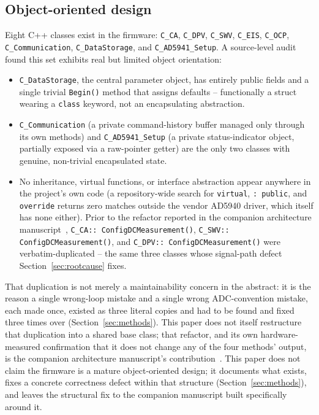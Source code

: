 \subsection{Object-oriented design}
\label{sec:oop}
Eight C++ classes exist in the firmware: \texttt{C\_CA}, \texttt{C\_DPV},
\texttt{C\_SWV}, \texttt{C\_EIS}, \texttt{C\_OCP}, \texttt{C\_Communication},
\texttt{C\_DataStorage}, and \texttt{C\_AD5941\_Setup}. A source-level audit
found this set exhibits real but limited object orientation:
\begin{itemize}
\item \texttt{C\_DataStorage}, the central parameter object, has entirely
  public fields and a single trivial \texttt{Begin()} method that assigns
  defaults -- functionally a struct wearing a \texttt{class} keyword, not
  an encapsulating abstraction.
\item \texttt{C\_Communication} (a private command-history buffer managed
  only through its own methods) and \texttt{C\_AD5941\_Setup} (a private
  status-indicator object, partially exposed via a raw-pointer getter) are
  the only two classes with genuine, non-trivial encapsulated state.
\item No inheritance, virtual functions, or interface abstraction appear
  anywhere in the project's own code (a repository-wide search for
  \texttt{virtual}, \texttt{: public}, and \texttt{override} returns zero
  matches outside the vendor AD5940 driver, which itself has none either).
  Prior to the refactor reported in the companion architecture
  manuscript~\cite{clement2026architecture}, \texttt{C\_CA::\allowbreak
  ConfigDCMeasurement()}, \texttt{C\_SWV::\allowbreak
  ConfigDCMeasurement()}, and \texttt{C\_DPV::\allowbreak
  ConfigDCMeasurement()} were verbatim-duplicated -- the same three
  classes whose signal-path defect Section~\ref{sec:rootcause} fixes.
\end{itemize}
That duplication is not merely a maintainability concern in the abstract:
it is the reason a single wrong-loop mistake and a single wrong
ADC-convention mistake, each made once, existed as three literal copies
and had to be found and fixed three times over
(Section~\ref{sec:methods}). This paper does not itself restructure that
duplication into a shared base class; that refactor, and its own
hardware-measured confirmation that it does not change any of the four
methods' output, is the companion architecture manuscript's
contribution~\cite{clement2026architecture}. This paper does not claim the
firmware is a mature object-oriented design; it documents what exists,
fixes a concrete correctness defect within that structure
(Section~\ref{sec:methods}), and leaves the structural fix to the
companion manuscript built specifically around it.

